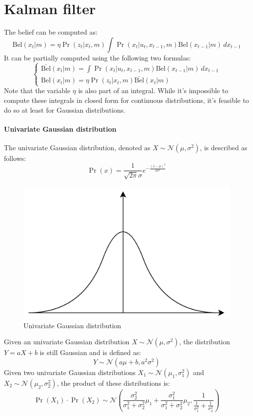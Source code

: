 \section{Kalman filter}

The belief can be computed as: 
\[\text{Bel}(x_t|m)=\eta\Pr(z_t|x_t,m)\int\Pr(x_t|u_t,x_{t-1},m)\text{Bel}(x_{t-1}|m)\,dx_{t-1}\]
It can be partially computed using the following two formulas:
\[\begin{cases}
    \bar{\text{Bel}}(x_t|m)=\int\Pr(x_t|u_t,x_{t-1},m)\text{Bel}(x_{t-1}|m)\,dx_{t-1} \\
    \text{Bel}(x_t|m)=\eta\Pr(z_t|x_t,m)\bar{\text{Bel}}(x_t|m)
\end{cases}\]
Note that the variable $\eta$ is also part of an integral.
While it's impossible to compute these integrals in closed form for continuous distributions, it's feasible to do so at least for Gaussian distributions.

\paragraph*{Univariate Gaussian distribution}
The univariate Gaussian distribution, denoted as $X\sim \mathcal{N}(\mu,\sigma^2)$, is described as follows:
\[\Pr(x)=\dfrac{1}{\sqrt{2\pi}\sigma}e^{-\frac{(x-\mu)^2}{2\sigma^2}}\]
\begin{figure}[H]
    \centering
    \includegraphics[width=0.5\linewidth]{images/ugd.png}
    \caption{Univariate Gaussian distribution}
\end{figure}
Given an univariate Gaussian distribution $X\sim \mathcal{N}(\mu,\sigma^2)$, the distribution $Y=aX+b$ is still Gaussian and is defined as:
\[Y\sim \mathcal{N}(a\mu+b,a^2\sigma^2)\]
Given two univariate Gaussian distributions $X_1\sim\mathcal{N}(\mu_1,\sigma_1^2)$ and $X_2\sim\mathcal{N}(\mu_2,\sigma_2^2)$, the product of these distributions is:
\[\Pr(X_1)\cdot\Pr(X_2)\sim\mathcal{N}\left(\dfrac{\sigma_2^2}{\sigma_1^2+\sigma_2^2}\mu_1+\dfrac{\sigma_1^2}{\sigma_1^2+\sigma_2^2}\mu_2,\dfrac{1}{\frac{1}{\sigma_1^2}+\frac{1}{\sigma_2^2}}\right)\]


